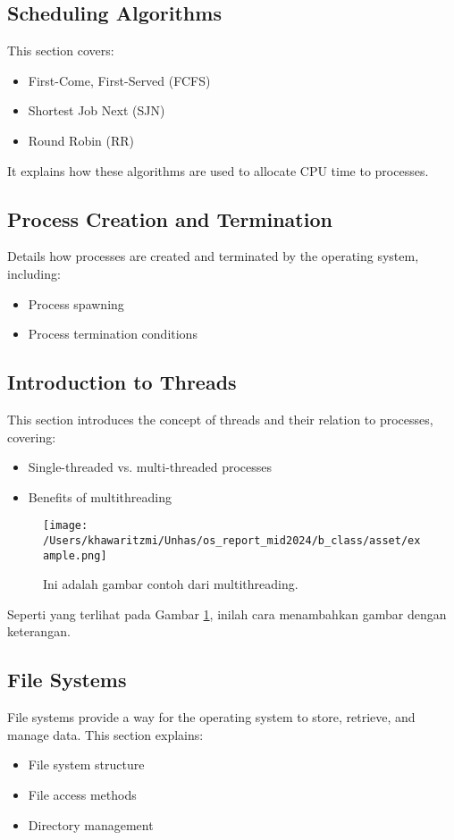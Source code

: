 \documentclass[12pt]{article}
\begin{document}
\subsection{Scheduling Algorithms}
This section covers:
\begin{itemize}
    \item First-Come, First-Served (FCFS)
    \item Shortest Job Next (SJN)
    \item Round Robin (RR)
\end{itemize}
It explains how these algorithms are used to allocate CPU time to processes.

\subsection{Process Creation and Termination}
Details how processes are created and terminated by the operating system, including:
\begin{itemize}
    \item Process spawning
    \item Process termination conditions
\end{itemize}

\subsection{Introduction to Threads}
This section introduces the concept of threads and their relation to processes, covering:
\begin{itemize}
    \item Single-threaded vs. multi-threaded processes
    \item Benefits of multithreading
\end{itemize}

\begin{figure}[h]
    \centering
    \texttt{[image: /Users/khawaritzmi/Unhas/os\_report\_mid2024/b\_class/asset/example.png]}  %
    \caption{Ini adalah gambar contoh dari multithreading.}
    \label{fig:contoh_gambar}
\end{figure}

Seperti yang terlihat pada Gambar \ref{fig:contoh_gambar}, inilah cara menambahkan gambar dengan keterangan.

\subsection{File Systems}
File systems provide a way for the operating system to store, retrieve, and manage data. This section explains:
\begin{itemize}
    \item File system structure
    \item File access methods
    \item Directory management
\end{itemize}
\end{document}
